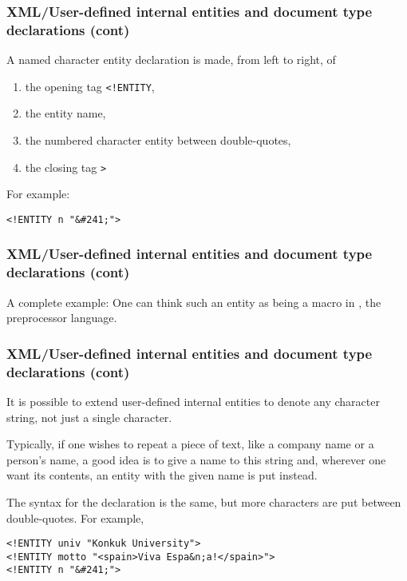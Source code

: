 %
\begin{frame}[containsverbatim]
\frametitle{XML/User-defined internal entities and document type declarations (cont)}

A named character entity declaration is made, from left to right, of
\begin{enumerate}

  \item the opening tag \verb|<!ENTITY|,

  \item the entity name,

  \item the numbered character entity between double-quotes,

  \item the closing tag \verb|>|

\end{enumerate}
For example:
\begin{verbatim}
<!ENTITY n "&#241;">
\end{verbatim}

\end{frame}

%
\begin{frame}
\frametitle{XML/User-defined internal entities and document type declarations (cont)}

A complete example:
One can think such an entity as being a macro in \Cpp, the \Clang
preprocessor language.

\end{frame}

%
\begin{frame}[containsverbatim]
\frametitle{XML/User-defined internal entities and document type declarations (cont)}

It is possible to extend user-defined internal entities to denote any
character string, not just a single character.

\bigskip

Typically, if one wishes to repeat a piece of text, like a company
name or a person's name, a good idea is to give a name to this string
and, wherever one want its contents, an entity with the given name is
put instead.

\bigskip

The syntax for the declaration is the same, but more characters are
put between double-quotes. For example,
\begin{verbatim}
<!ENTITY univ "Konkuk University">
<!ENTITY motto "<spain>Viva Espa&n;a!</spain>">
<!ENTITY n "&#241;">
\end{verbatim}

\end{frame}

